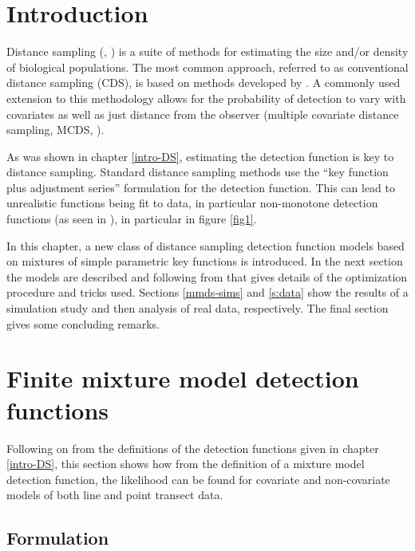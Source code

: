 \label{chap-mmds}

\section{Introduction}
\label{s:intro}

Distance sampling (\cite{IDS}, \cite{ADS}) is a suite of methods for estimating the size and/or density of biological populations. The most common approach, referred to as conventional distance sampling (CDS), is based on methods developed by . A commonly used extension to this methodology allows for the probability of detection to vary with covariates as well as just distance from the observer (multiple covariate distance sampling, MCDS, \cite[chapter 3]{ADS}). 

As was shown in chapter \ref{intro-DS}, estimating the detection function is key to distance sampling. Standard distance sampling methods use the ``key function plus adjustment series'' formulation for the detection function. This can lead to unrealistic functions being fit to data, in particular non-monotone detection functions (as seen in ), in particular in figure \ref{fig1}.

In this chapter, a new class of distance sampling detection function models based on mixtures of simple parametric key functions is introduced. In the next section the models are described and following from that  gives details of the optimization procedure and tricks used. Sections \ref{mmds-sims} and \ref{s:data} show the results of a simulation study and then analysis of real data, respectively. The final section gives some concluding remarks.

\section{Finite mixture model detection functions}

Following on from the definitions of the detection functions given in chapter \ref{intro-DS}, this section shows how from the definition of a mixture model detection function, the likelihood can be found for covariate and non-covariate models of both line and point transect data.

\subsection{Formulation}
\label{s:detfcts}

